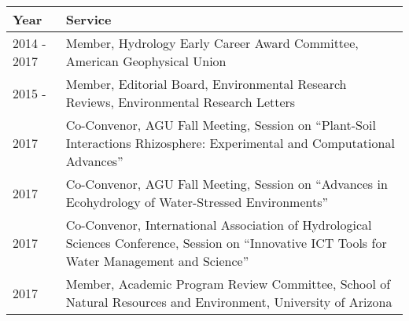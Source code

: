 
\begin{longtable}{lp{15cm}}
Year & Service\\
\hline 
\endhead 
2014 - 2017 & Member, Hydrology Early Career Award Committee, American Geophysical Union \\
2015 -  & Member, Editorial Board, Environmental Research Reviews, Environmental Research Letters \\
2017 & Co-Convenor, AGU Fall Meeting, Session on ``Plant-Soil Interactions Rhizosphere: Experimental and Computational Advances'' \\
2017 & Co-Convenor, AGU Fall Meeting, Session on ``Advances in Ecohydrology of Water-Stressed Environments'' \\
2017 & Co-Convenor, International Association of Hydrological Sciences Conference, Session on ``Innovative ICT Tools for Water Management and Science'' \\
2017 & Member, Academic Program Review Committee, School of Natural Resources and Environment, University of Arizona \\
\end{longtable}

